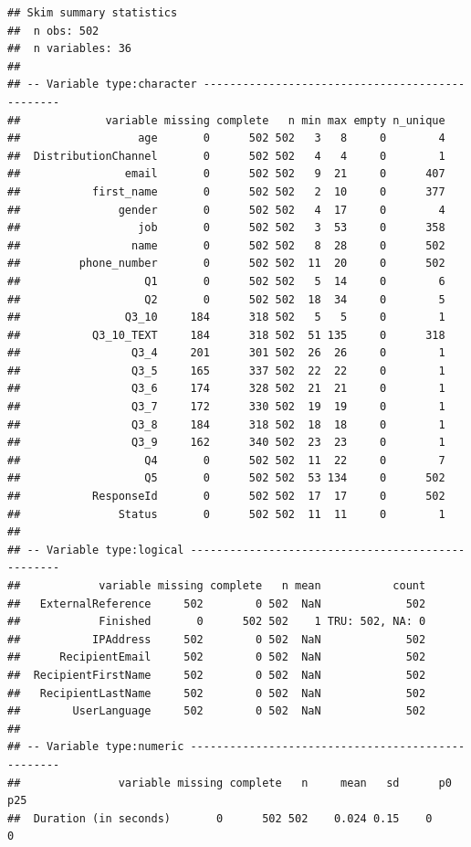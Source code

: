 \documentclass[]{book}
\begin{document}
\begin{verbatim}
## Skim summary statistics
##  n obs: 502 
##  n variables: 36 
## 
## -- Variable type:character ------------------------------------------------
##             variable missing complete   n min max empty n_unique
##                  age       0      502 502   3   8     0        4
##  DistributionChannel       0      502 502   4   4     0        1
##                email       0      502 502   9  21     0      407
##           first_name       0      502 502   2  10     0      377
##               gender       0      502 502   4  17     0        4
##                  job       0      502 502   3  53     0      358
##                 name       0      502 502   8  28     0      502
##         phone_number       0      502 502  11  20     0      502
##                   Q1       0      502 502   5  14     0        6
##                   Q2       0      502 502  18  34     0        5
##                Q3_10     184      318 502   5   5     0        1
##           Q3_10_TEXT     184      318 502  51 135     0      318
##                 Q3_4     201      301 502  26  26     0        1
##                 Q3_5     165      337 502  22  22     0        1
##                 Q3_6     174      328 502  21  21     0        1
##                 Q3_7     172      330 502  19  19     0        1
##                 Q3_8     184      318 502  18  18     0        1
##                 Q3_9     162      340 502  23  23     0        1
##                   Q4       0      502 502  11  22     0        7
##                   Q5       0      502 502  53 134     0      502
##           ResponseId       0      502 502  17  17     0      502
##               Status       0      502 502  11  11     0        1
## 
## -- Variable type:logical --------------------------------------------------
##            variable missing complete   n mean           count
##   ExternalReference     502        0 502  NaN             502
##            Finished       0      502 502    1 TRU: 502, NA: 0
##           IPAddress     502        0 502  NaN             502
##      RecipientEmail     502        0 502  NaN             502
##  RecipientFirstName     502        0 502  NaN             502
##   RecipientLastName     502        0 502  NaN             502
##        UserLanguage     502        0 502  NaN             502
## 
## -- Variable type:numeric --------------------------------------------------
##               variable missing complete   n     mean   sd      p0     p25
##  Duration (in seconds)       0      502 502    0.024 0.15    0       0   

\end{verbatim}
\end{document}
